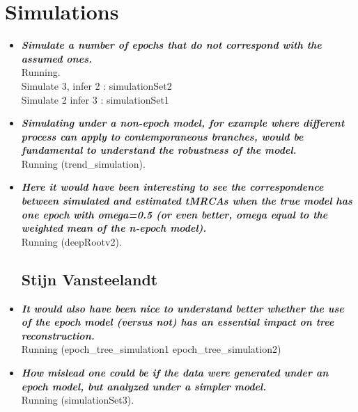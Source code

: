 \documentclass[english]{article}
\begin{document}


\setcounter{page}{1}

\bigskip
\medskip
{}
\bigskip


\section*{Simulations}

\begin{itemize}

\subsection*{David Posada}

\item {
{\it
\textbf{
Simulate a number of epochs that do not correspond with the assumed ones.
}%
}%
}%
\\
Running. \\
Simulate 3, infer 2 : simulationSet2 \\
Simulate 2 infer 3 : simulationSet1 


\item {
{\it
\textbf{
Simulating under a non-epoch model, for example where different process can apply to contemporaneous branches, would be fundamental to understand the robustness of the model.
}%
}%
}%
\\
Running (trend\_simulation).



\item {
{\it
\textbf{
Here it would have been interesting to see the correspondence between simulated and estimated tMRCAs when the true model has one epoch with omega=0.5 (or even better, omega equal to the weighted mean of the n-epoch model).
}%
}%
}%
\\
Running (deepRootv2).

\subsection*{Stijn Vansteelandt}

\item {
{\it
\textbf{
It would also have been nice to understand better whether the use of the
epoch model (versus not) has an essential impact on tree reconstruction.
}%
}%
}%
\\
Running (epoch\_tree\_simulation1 epoch\_tree\_simulation2)


\item {
{\it
\textbf{
How mislead one could be if the data were generated under an epoch model, but analyzed under a simpler model.
}%
}%
}%
\\
Running (simulationSet3).


\end{itemize}
\end{document}
